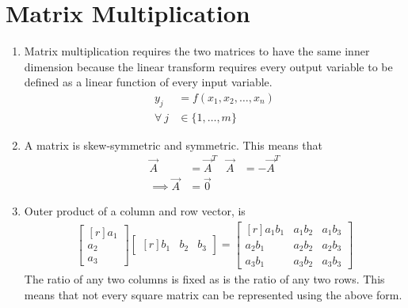\section{Matrix Multiplication}
\begin{enumerate}
    \item Matrix multiplication requires the two matrices to have the same inner
          dimension because the linear transform requires every output variable to be
          defined as a linear function of every input variable.
          \begin{align}
              y_j        & = f(x_1, x_2,\dots,x_n) \\
              \forall\ j & \in \{1,\dots,m\}
          \end{align}

    \item A matrix is skew-symmetric and symmetric. This means that
          \begin{align}
              \vec{A}          & = \vec{A}^T & \vec{A} & = -\vec{A}^T \\
              \implies \vec{A} & = \vec{0}
          \end{align}

    \item Outer product of a column and row vector, is
          \begin{align}
              \begin{bmatrix*}[r]
                  a_1 \\ a_2 \\ a_3
              \end{bmatrix*} \begin{bmatrix*}[r]
                                 b_1 & b_2 & b_3
                             \end{bmatrix*} = \begin{bmatrix*}[r]
                                                  a_1b_1 & a_1b_2 & a_1b_3 \\
                                                  a_2b_1 & a_2b_2 & a_2b_3 \\
                                                  a_3b_1 & a_3b_2 & a_3b_3
                                              \end{bmatrix*}
          \end{align}
          The ratio of any two columns is fixed as is the ratio of any two rows. This
          means that not every square matrix can be represented using the above form.


\end{enumerate}
